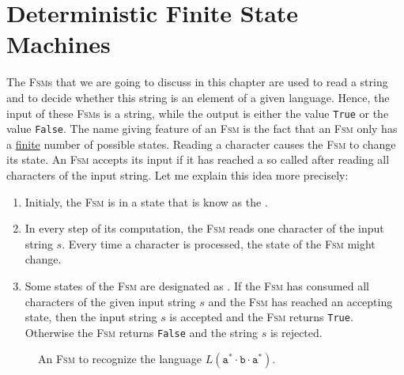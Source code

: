 \section{Deterministic Finite State Machines}
The \textsc{Fsm}s that we are going to discuss in this chapter are used to read a string and
to decide whether this string is an element of a given language.  Hence, the input of these 
\textsc{Fsm}s is a string, while the output is either the value \texttt{True} or the value \texttt{False}.
The name giving feature of an \textsc{Fsm} is the fact that an \textsc{Fsm} only has a
\underline{finite} number of possible states.  Reading a character causes the \textsc{Fsm} to change its state.
An \textsc{Fsm} accepts its input if it has reached a so called  after reading
all characters of the input string.  Let me explain this idea more precisely:
\begin{enumerate}
\item Initialy, the \textsc{Fsm} is in a state that is know as the . 
\item In every step of its computation, the \textsc{Fsm} reads one character of the input string
      $s$.  Every time a character is processed, the state of the \textsc{Fsm} might change.
\item Some states of the \textsc{Fsm} are designated as .  
      If the \textsc{Fsm} has consumed all characters of the given input string $s$ and the \textsc{Fsm}
      has reached an accepting state, then the input string $s$ is accepted and the \textsc{Fsm}
      returns \texttt{True}.  Otherwise the \textsc{Fsm} returns \texttt{False} and the string $s$
      is rejected.
\end{enumerate}
\begin{figure}[!ht]
  \centering
   \caption{An \textsc{Fsm} to recognize the language $L(\texttt{a}^*\cdot\texttt{b}\cdot\texttt{a}^*)$.}
  \label{fig:abstara.dot}
\end{figure}



